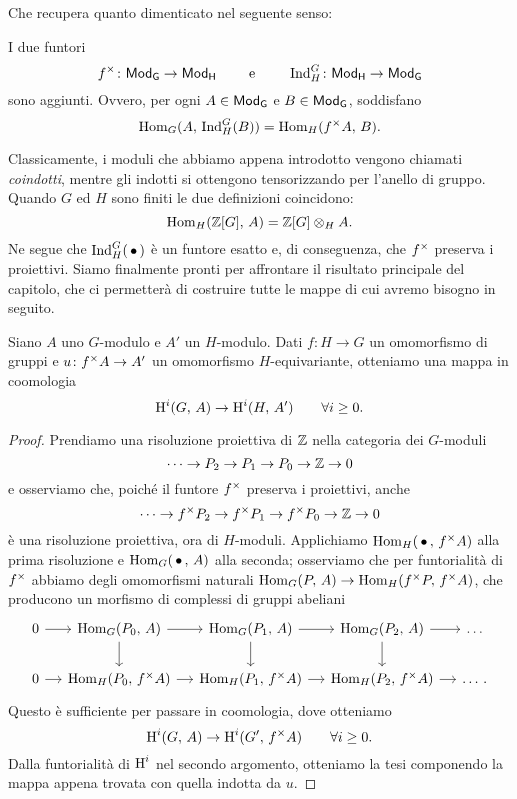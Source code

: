 Che recupera quanto dimenticato nel seguente senso:

\begin{proposition}\label{aggiunzione}
	I due funtori
	\[ f^\times \colon \mathsf{Mod}_\mathsf{G} \to \mathsf{Mod}_\mathsf{H} \qquad\text{ e }\qquad  \operatorname{Ind}_H^G \colon \mathsf{Mod}_\mathsf{H} \to \mathsf{Mod}_\mathsf{G} \]
	sono aggiunti. Ovvero, per ogni $ A \in \mathsf{Mod}_\mathsf{G} $ e $ B \in \mathsf{Mod}_\mathsf{G} $, soddisfano
	\[ \operatorname{Hom}_G(A,\, \operatorname{Ind}_H^G(B)) = \operatorname{Hom}_H(f^\times A, \, B). \]
\end{proposition}

Classicamente, i moduli che abbiamo appena introdotto vengono chiamati \emph{coindotti}, mentre gli indotti si ottengono tensorizzando per l'anello di gruppo. Quando $ G $ ed $ H $ sono finiti le due definizioni coincidono:
\[ \operatorname{Hom}_H(\mathbb{Z}[G], \, A)  = \mathbb{Z}[G] \otimes_H A. \]
Ne segue che $ \operatorname{Ind}_{H}^G(\, \bullet \, ) $ è un funtore esatto e, di conseguenza, che $ f^\times $ preserva i proiettivi. Siamo finalmente pronti per affrontare il risultato principale del capitolo, che ci permetterà di costruire tutte le mappe di cui avremo bisogno in seguito.
\begin{proposition}\label{funct}
	Siano  $ A $ uno $ G $-modulo e $ A' $ un $ H $-modulo. Dati $ f \colon H \to G $ un omomorfismo di gruppi e $ u \colon f^\times A \to A' $ un omomorfismo $ H $-equivariante, otteniamo una mappa in coomologia
	\[ \operatorname{H}^i(G, \, A) \to \operatorname{H}^i(H, \, A') \qquad\forall i \geq 0. \]
\end{proposition}

\begin{proof}
	Prendiamo una risoluzione proiettiva di $ \mathbb{Z} $ nella categoria dei $ G $-moduli
	\[ \dots \to P_2 \to P_1 \to P_0 \to \mathbb{Z} \to 0 \]
	e osserviamo che, poiché il funtore $ f^\times $ preserva i proiettivi, anche
	\[ \dots \to f^\times P_2 \to  f^\times P_1 \to f^\times P_0 \to \mathbb{Z} \to 0 \]
	è una risoluzione proiettiva, ora di $ H $-moduli.
	Applichiamo $ \operatorname{Hom}_H(\,\bullet\, ,\, f^\times A) $ alla prima risoluzione e $ \operatorname{Hom}_G(\,\bullet\, ,\, A) $ alla seconda; osserviamo che per funtorialità di $ f^\times $ abbiamo degli omomorfismi naturali $ \operatorname{Hom}_{G}(P, \, A) \to \operatorname{Hom}_{H}(f^\times P, \,f^\times A) $, che producono un morfismo di complessi di gruppi abeliani
	\[\begin{tikzcd}[column sep = small]
	0 \rar
	& \Hom_{G}(P_0, \, A) \rar \dar
	& \Hom_{G}(P_1, \, A) \rar \dar
	& \Hom_{G}(P_2, \, A) \rar \dar
	& \dots \\
	0 \rar
	& \Hom_{H}(P_0, \,\f A) \rar
	& \Hom_{H}(P_1, \,\f A) \rar
	& \Hom_{H}(P_2, \,\f A) \rar
	& \dots	\, .
	\end{tikzcd} \]
	Questo è sufficiente per passare in coomologia, dove otteniamo
	\[ \operatorname{H}^i(G, \, A) \to \operatorname{H}^i(G', \, f^\times A) \qquad \forall i \geq 0. \]
	Dalla funtorialità di $ \operatorname{H}^i $ nel secondo argomento, otteniamo la tesi componendo la mappa appena trovata con quella indotta da $ u $.
\end{proof}

